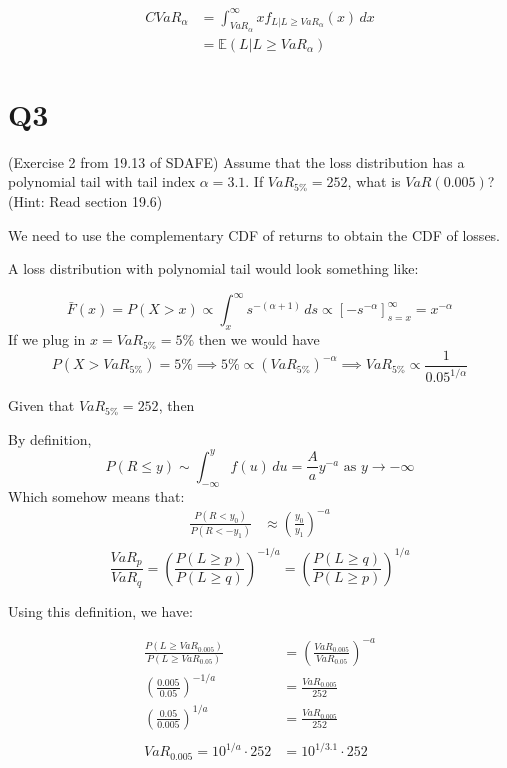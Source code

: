 \documentclass[
  oneside]{book}
\begin{document}
\[
\begin{aligned}
CVaR_{\alpha} &=\int ^{\infty}_{VaR_{\alpha}} x f_{L|L\geq VaR_{\alpha}}(x) \, dx\\
&= \mathbb{E}(L|L\geq VaR_{\alpha})
\end{aligned}
\]

\hypertarget{q3-5}{%
\section{Q3}\label{q3-5}}

(Exercise 2 from 19.13 of SDAFE) Assume that the loss distribution has a polynomial tail with tail index \(α = 3.1\). If \(VaR_{5\%} = 252\), what is \(VaR(0.005)\)? (Hint: Read section 19.6)

We need to use the complementary CDF of returns to obtain the CDF of losses.

A loss distribution with polynomial tail would look something like:

\[
\bar{F}(x) = P(X>x) \propto \int ^{\infty}_{x} s^{-(\alpha+1)} \, ds \propto [-s^{-\alpha}]^{\infty}_{s=x} = x^{-\alpha}
\]
If we plug in \(x = VaR_{5\%} = 5\%\) then we would have
\[
P(X > VaR_{5\%}) = 5\% \implies 5\% \propto (VaR_{5\%})^{-\alpha} \implies VaR_{5\%} \propto \frac{1}{0.05^{1/\alpha}}
\]

Given that \(VaR_{5\%} = 252\), then

By definition,
\[
P(R \leq y) \sim \int^{y}_{-\infty} f(u) \, du = \frac{A}{a}y^{-a} \text{ as } y \to -\infty
\]
Which somehow means that:
\[
\begin{aligned}
\frac{P(R < y_{0})}{P(R< -y_{1})} &\approx \left( \frac{y_{0}}{y_{1}} \right)^{-a}\\
\end{aligned}
\]
\[
\frac{VaR_{p}}{VaR_{q}} = \left( \frac{P(L \geq p)}{P(L\geq q)} \right)^{-1/a} = \left( \frac{P(L \geq q)}{P(L\geq p)} \right)^{1/a}
\]

Using this definition, we have:

\[
\begin{aligned}
\frac{P(L \geq VaR_{0.005})}{P(L \geq VaR_{0.05})} &= \left(  \frac{VaR_{0.005}}{VaR_{0.05}}\right) ^{-a}\\
\left( \frac{0.005}{0.05} \right)^{-1/a} &= \frac{VaR_{0.005}}{252}\\
\left( \frac{0.05}{0.005} \right)^{1/a} &= \frac{VaR_{0.005}}{252}\\
\\
VaR_{0.005} = 10^{1/a}\cdot 252 &= 10^{1/3.1}\cdot 252
\end{aligned}
\]
\end{document}
